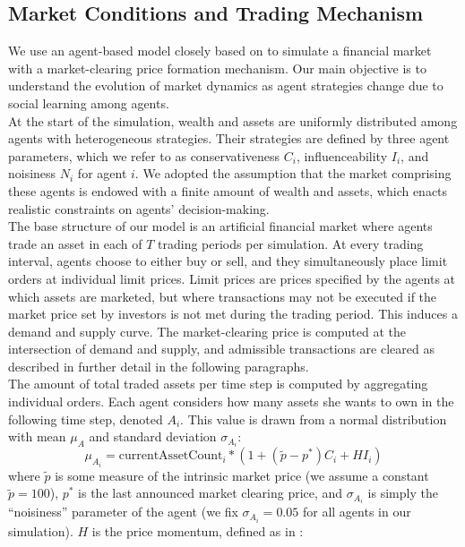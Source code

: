 \documentclass[11pt]{article}
\begin{document}
\subsection{Market Conditions and Trading Mechanism}
We use an agent-based model closely based on \citet{raberto2001agent} to simulate a financial market with a market-clearing price formation mechanism. Our main objective is to understand the evolution of market dynamics as agent strategies change due to social learning among agents. \\
At the start of the simulation, wealth and assets are uniformly distributed among agents with heterogeneous strategies. Their strategies are defined by three agent parameters, which we refer to as conservativeness $C_i$, influenceability $I_i$, and noisiness $N_i$ for agent $i$. We adopted the assumption that the market comprising these agents is endowed with a finite amount of wealth and assets, which enacts realistic constraints on agents' decision-making. \\
The base structure of our model is an artificial financial market where agents trade an asset in each of $T$ trading periods per simulation. At every trading interval, agents choose to either buy or sell, and they simultaneously place limit orders at individual limit prices. Limit prices are prices specified by the agents at which assets are marketed, but where transactions may not be executed if the market price set by investors is not met during the trading period. This induces a demand and supply curve. The market-clearing price is computed at the intersection of demand and supply, and admissible transactions are cleared as described in further detail in the following paragraphs. \\
The amount of total traded assets per time step is computed by aggregating individual orders. Each agent considers how many assets she wants to own in the following time step, denoted $A_i$. This value is drawn from a normal distribution with mean $\mu_A$ and standard deviation $\sigma_{A_i}$:
\begin{equation}
\mu_{A_i} = \text{currentAssetCount}_i * (1 + (\tilde{p} - p^{*}) C_i + H I_i)
\end{equation}
where $\tilde{p}$ is some measure of the intrinsic market price (we assume a constant $\tilde{p}=100$), $p^*$ is the last announced market clearing price, and $\sigma_{A_i}$ is simply the ``noisiness'' parameter of the agent (we fix $\sigma_{A_i} = 0.05$ for all agents in our simulation). $H$ is the price momentum, defined as in \citet {kaizoji2015super}:
\end{document}
